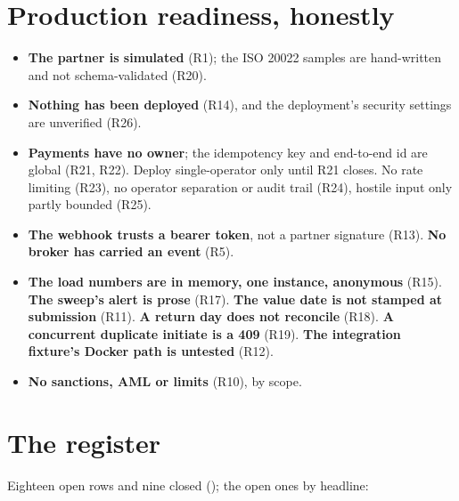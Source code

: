 \documentclass[11pt,a4paper]{article}
\begin{document}
\section{Production readiness, honestly}

\begin{itemize}[leftmargin=1.4em]
  \item \textbf{The partner is simulated} (R1); the ISO 20022 samples are hand-written and not
        schema-validated (R20).
  \item \textbf{Nothing has been deployed} (R14), and the deployment's security settings are
        unverified (R26).
  \item \textbf{Payments have no owner}; the idempotency key and end-to-end id are global (R21, R22).
        Deploy single-operator only until R21 closes. No rate limiting (R23), no operator separation
        or audit trail (R24), hostile input only partly bounded (R25).
  \item \textbf{The webhook trusts a bearer token}, not a partner signature (R13).
        \textbf{No broker has carried an event} (R5).
  \item \textbf{The load numbers are in memory, one instance, anonymous} (R15). \textbf{The sweep's
        alert is prose} (R17). \textbf{The value date is not stamped at submission} (R11).
        \textbf{A return day does not reconcile} (R18). \textbf{A concurrent duplicate initiate is a
        409} (R19). \textbf{The integration fixture's Docker path is untested} (R12).
  \item \textbf{No sanctions, AML or limits} (R10), by scope.
\end{itemize}

\section{The register}

Eighteen open rows and nine closed (); the open ones by headline:
\end{document}
